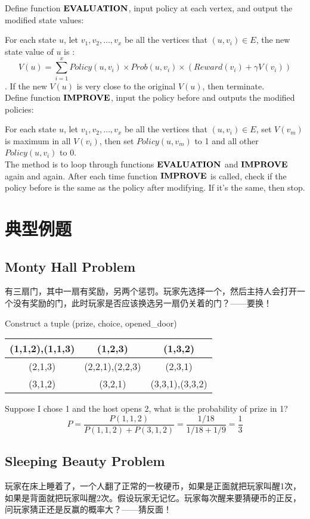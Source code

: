 \documentclass[12pt,a4paper]{ctexrep}
\begin{document}
Define function $\bold{EVALUATION}$, input policy at each vertex, and output the modified state values:

For each state $u$, let $v_1,v_2,\dots, v_x$ be all the vertices that $(u,v_i)\in E$, the new state value of $u$ is :\[V(u)=\sum_{i=1}^{x} Policy(u,v_i)\times Prob(u,v_i)\times (Reward(v_i)+\gamma V(v_i))\]. If the new $V(u)$ is very close to the original $V(u)$, then terminate.\\

Define function $\bold{IMPROVE}$, input the policy before and outputs the modified policies:

For each state $u$, let $v_1,v_2,\dots, v_x$ be all the vertices that $(u,v_i)\in E$, set $V(v_m)$ is maximum in all $V(v_i)$, then set $Policy(u,v_m)$ to 1 and all other $Policy(u,v_i)$ to 0. \\

The method is to loop through functions $\bold{EVALUATION}$ and $\bold{IMPROVE}$ again and again. After each time function $\bold{IMPROVE}$ is called, check if the policy before is the same as the policy after modifying. If it's the same, then stop.
\section{典型例题}
\subsection{Monty Hall Problem}
有三扇门，其中一扇有奖励，另两个惩罚。玩家先选择一个，然后主持人会打开一个没有奖励的门，此时玩家是否应该换选另一扇仍关着的门？——要换！

Construct a tuple (prize, choice, opened\_door)
\begin{center}
\begin{tabular}{|c|c|c|}
\hline
(1,1,2),(1,1,3) & (1,2,3) & (1,3,2)\\
\hline
(2,1,3) & (2,2,1),(2,2,3) & (2,3,1)\\
\hline
(3,1,2) & (3,2,1) & (3,3,1),(3,3,2)\\
\hline
\end{tabular}
\end{center}
Suppose I chose 1 and the host opens 2, what is the probability of prize in 1? \[P = \frac{P(1,1,2)}{P(1,1,2)+P(3,1,2)} = \frac{1/18}{1/18+1/9} = \frac{1}{3}\]
\subsection{Sleeping Beauty Problem}
玩家在床上睡着了，一个人翻了正常的一枚硬币，如果是正面就把玩家叫醒1次，如果是背面就把玩家叫醒2次。假设玩家无记忆。玩家每次醒来要猜硬币的正反，问玩家猜正还是反赢的概率大？——猜反面！
\end{document}
